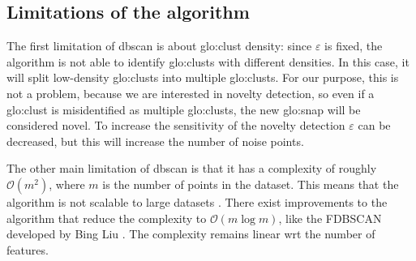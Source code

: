\subsection{Limitations of the algorithm}
The first limitation of \gls{dbscan} is about \gls{glo:clust} density: since $\varepsilon$ is fixed, the algorithm is not able to identify \gls{glo:clust}s with different densities. In this case, it will split low-density \gls{glo:clust}s into multiple \gls{glo:clust}s. For our purpose, this is not a problem, because we are interested in novelty detection, so even if a \gls{glo:clust} is misidentified as multiple \gls{glo:clust}s, the new \gls{glo:snap} will be considered novel. To increase the sensitivity of the novelty detection $\varepsilon$ can be decreased, but this will increase the number of noise points.

The other main limitation of \gls{dbscan} is that it has a complexity of roughly $\mathcal{O}(m^2)$, where $m$ is the number of points in the dataset. This means that the algorithm is not scalable to large datasets . There exist improvements to the algorithm that reduce the complexity to $\mathcal{O}(m\log m)$, like the FDBSCAN developed by Bing Liu \cite{dbscanlogm}. The complexity remains linear \gls{wrt} the number of features.
